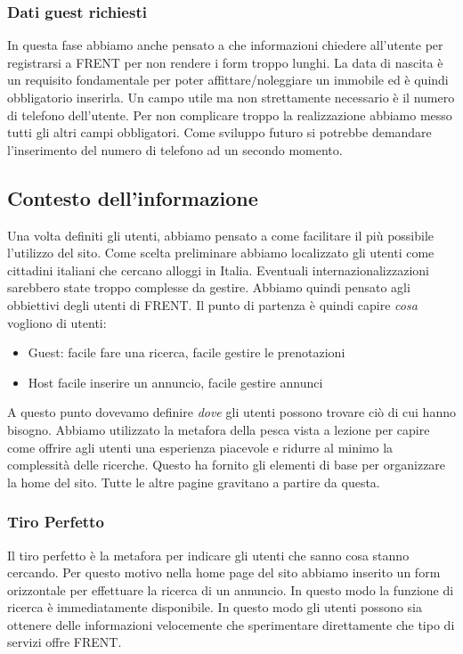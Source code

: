 \documentclass[1_relazione.tex]{subfiles}
\begin{document}
\subsubsection{Dati guest richiesti}
In questa fase abbiamo anche pensato a che informazioni chiedere all'utente per registrarsi a FRENT per non rendere i form troppo lunghi. La data di nascita \`{e} un requisito fondamentale per poter affittare/noleggiare un immobile ed \`{e} quindi obbligatorio inserirla. Un campo utile ma non strettamente necessario \`{e} il numero di telefono dell'utente. Per non complicare troppo la realizzazione abbiamo messo tutti gli altri campi obbligatori. Come sviluppo futuro si potrebbe demandare l'inserimento del numero di telefono ad un secondo momento.

\subsection{Contesto dell'informazione }
Una volta definiti gli utenti, abbiamo pensato a come facilitare il pi\`{u} possibile l'utilizzo del sito. Come scelta preliminare abbiamo localizzato gli utenti come cittadini italiani che cercano alloggi in Italia. Eventuali internazionalizzazioni sarebbero state troppo complesse da gestire. Abbiamo quindi pensato agli obbiettivi degli utenti di FRENT.  Il punto di partenza \`{e} quindi capire \textit{cosa} vogliono di utenti:

\begin{itemize}
\item Guest: facile fare una ricerca, facile gestire le prenotazioni 
\item Host facile inserire un annuncio, facile gestire annunci
\end{itemize}

A questo punto dovevamo definire \textit{dove} gli utenti possono trovare ci\`{o} di cui hanno bisogno. Abbiamo utilizzato la metafora della pesca vista a lezione per capire come offrire agli utenti una esperienza piacevole e ridurre al minimo la complessit\`{a} delle ricerche. Questo ha fornito gli elementi di base per organizzare la home del sito. Tutte le altre pagine gravitano a partire da questa.

\subsubsection{Tiro Perfetto} 
Il tiro perfetto \`{e} la metafora per indicare gli utenti che sanno cosa stanno cercando. Per questo motivo nella home page del sito abbiamo inserito un form orizzontale per effettuare la ricerca di un annuncio. In questo modo la funzione di ricerca \`{e} immediatamente disponibile. In questo modo gli utenti possono sia ottenere delle informazioni velocemente che sperimentare direttamente che tipo di servizi offre FRENT.
 
\end{document}
